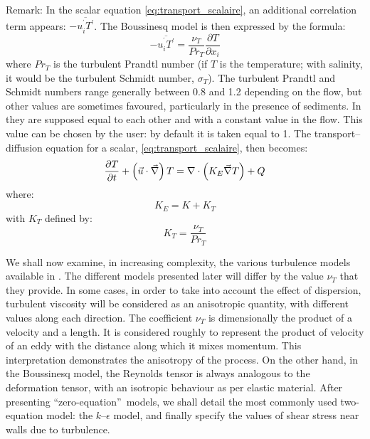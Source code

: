 \begin{CommentBlock}{Remark:}
  In the scalar equation \eqref{eq:transport_scalaire}, an additional correlation
  term appears: $-\overline{u_{i}^{^{\prime}}T^{\prime}}$.
  The Boussinesq model is then expressed by the formula:%
  \begin{equation}
    -\overline{u_{i}^{^{\prime}}T^{\prime}}=\dfrac{\nu_T}{Pr_T}\dfrac{\partial
      T}{\partial x_{i}}%
  \end{equation}
  where $Pr_T$ is the turbulent Prandtl number (if $T$ is the temperature; with salinity,
  it would be the turbulent Schmidt number, $\sigma_{T}$).
  The turbulent Prandtl and Schmidt numbers range generally between 0.8
  and 1.2 depending on the flow, but other values are sometimes favoured,
  particularly in the presence of sediments. In  they are supposed equal
  to each other and with a constant value in the flow. This value can be
  chosen by the user: by default it is taken equal to 1.
  The transport--diffusion equation for a scalar,  \eqref{eq:transport_scalaire}, then becomes:
  \begin{equation}\label{eq:transport_scalaire_turb}
    \dfrac{\partial T}{\partial t}+\left(\vec{u}\cdot\vec \nabla\right) T =
    \nabla \cdot\left(K_E\vec \nabla T\right)+Q
  \end{equation}
  where:
  \begin{equation}
    K_E=K+K_T
  \end{equation}
  with $K_T$ defined by:
  \begin{equation}
    K_T = \dfrac{\nu_T}{Pr_T}
  \end{equation}
\end{CommentBlock}

We shall now examine, in increasing complexity, the various turbulence models available in .
The different models presented later will differ by the value $\nu_T$ that they provide. In some
cases, in order to take into account the effect of dispersion, turbulent
viscosity will be considered as an anisotropic quantity, with different values
along each direction. The coefficient $\nu_T$ is dimensionally the product
of a velocity and a length. It is considered roughly to represent the product
of velocity of an eddy with the distance along which it mixes momentum. This
interpretation demonstrates the anisotropy of the process. On the other hand,
in the Boussinesq model, the Reynolds tensor%
is always analogous to the deformation tensor, with an isotropic behaviour as
per elastic material.
After presenting \textquotedblleft zero-equation\textquotedblright\ models, we
shall detail the most commonly used two-equation
model: the $k$--$\epsilon$ model, and finally specify the values of shear stress near walls
due to turbulence.

